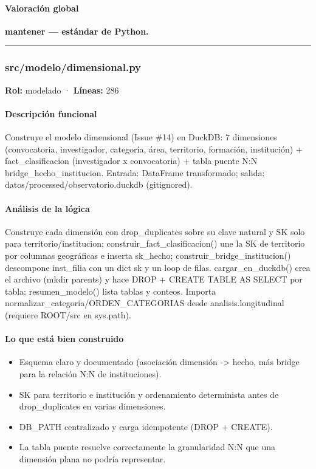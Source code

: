 \paragraph{Valoración global}
\textbf{mantener --- estándar de Python.}

\medskip
\hrule

\subsubsection{src/modelo/dimensional.py}
\textbf{Rol:} modelado · \textbf{Líneas:} 286

\paragraph{Descripción funcional}
Construye el modelo dimensional (Issue \#14) en DuckDB: 7 dimensiones (convocatoria, investigador, categoría, área, territorio, formación, institución) + fact\_clasificacion (investigador x convocatoria) + tabla puente N:N bridge\_hecho\_institucion. Entrada: DataFrame transformado; salida: datos/processed/observatorio.duckdb (gitignored).

\paragraph{Análisis de la lógica}
Construye cada dimensión con drop\_duplicates sobre su clave natural y SK solo para territorio/institucion; construir\_fact\_clasificacion() une la SK de territorio por columnas geográficas e inserta sk\_hecho; construir\_bridge\_institucion() descompone inst\_filia con un dict sk y un loop de filas. cargar\_en\_duckdb() crea el archivo (mkdir parents) y hace DROP + CREATE TABLE AS SELECT por tabla; resumen\_modelo() lista tablas y conteos. Importa normalizar\_categoria/ORDEN\_CATEGORIAS desde analisis.longitudinal (requiere ROOT/src en sys.path).

\paragraph{Lo que está bien construido}
\begin{itemize}
  \item Esquema claro y documentado (asociación dimensión -> hecho, más bridge para la relación N:N de instituciones).
  \item SK para territorio e institución y ordenamiento determinista antes de drop\_duplicates en varias dimensiones.
  \item DB\_PATH centralizado y carga idempotente (DROP + CREATE).
  \item La tabla puente resuelve correctamente la granularidad N:N que una dimensión plana no podría representar.
\end{itemize}

